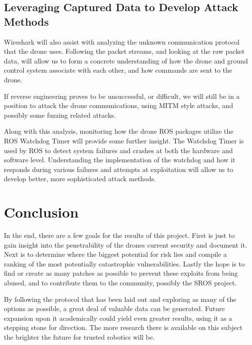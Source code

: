\documentclass[IEEEtran,letterpaper,10pt,notitlepage,draftclsnofoot,onecolumn]{article}
\begin{document}
\subsection{Leveraging Captured Data to Develop Attack Methods}
Wireshark will also assist with analyzing the unknown communication protocol that the drone uses. Following the packet
streams, and looking at the raw packet data, will allow us to form a concrete understanding of how the drone and
ground control system associate with each other, and how commands are sent to the drone\cite{UknProto}.

If reverse engineering proves to be unsuccessful, or difficult, we will still be in a position to attack the drone
communications, using MITM style attacks, and possibly some fuzzing related attacks\cite{Fuzzy}.

Along with this analysis, monitoring how the drone ROS packages utilize the ROS Watchdog Timer will provide some
further insight. The Watchdog Timer is used by ROS to detect system failures and crashes at both the hardware and
software level\cite{doggo_watching}. Understanding the implementation of the watchdog and how it responds
during various failures and attempts at exploitation will allow us to develop better, more sophisticated attack
methods.

\section{Conclusion}
In the end, there are a few goals for the results of this project. 
First is just to gain insight into the penetrability of the drones current security and document it.
Next is to determine where the biggest potential for risk lies and compile a ranking of the most potentially catastrophic vulnerabilities.
Lastly the hope is to find or create as many patches as possible to prevent these exploits from being abused, and to contribute them to the community, possibly the SROS project. 

By following the protocol that has been laid out and exploring as many of the options as possible, a great deal of valuable data can be generated.
Future expansion upon it academically could yield even greater results, using it as a stepping stone for direction.
The more research there is available on this subject the brighter the future for trusted robotics will be.



\end{document}
